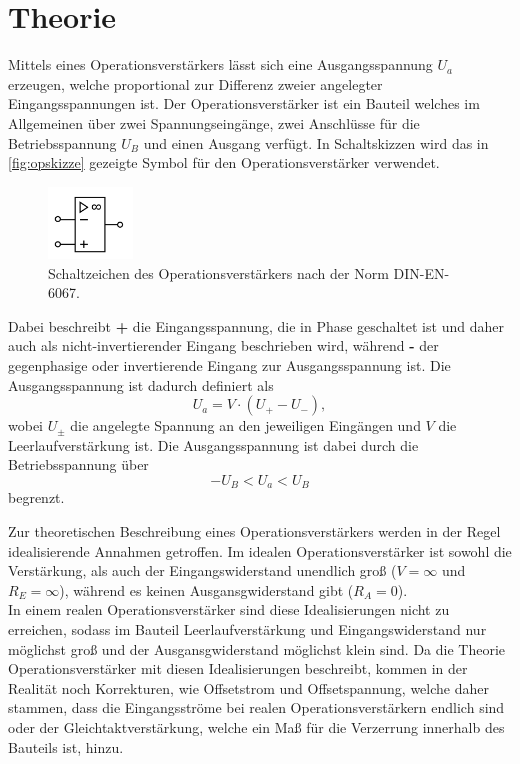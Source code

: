 \section{Theorie}
\label{sec:theorie}
Mittels eines Operationsverstärkers lässt sich eine Ausgangsspannung $U_a$ erzeugen, welche 
proportional zur Differenz zweier angelegter Eingangsspannungen ist. 
Der Operationsverstärker ist ein Bauteil welches im Allgemeinen über zwei Spannungseingänge, zwei Anschlüsse 
für die Betriebsspannung $U_B$ und einen Ausgang 
verfügt. In Schaltskizzen wird 
das in \autoref{fig:opskizze} gezeigte Symbol für den Operationsverstärker verwendet.
\begin{figure}[H]
    \centering
    \includegraphics[width=0.2\textwidth]{op.png}
    \caption{Schaltzeichen des Operationsverstärkers \cite{anleitung} nach der Norm DIN-EN-6067.}
    \label{fig:opskizze}
\end{figure}
Dabei beschreibt 
\textbf{+} die Eingangsspannung, die in Phase geschaltet ist und daher auch als nicht-invertierender
Eingang beschrieben wird, während \textbf{-} der gegenphasige oder invertierende Eingang 
zur Ausgangsspannung ist. Die Ausgangsspannung ist dadurch definiert als 
\begin{equation*}
    U_a = V \cdot  (U_+ - U_-),
\end{equation*}
wobei $U_{\pm}$ die angelegte Spannung an den jeweiligen Eingängen und $V$ die Leerlaufverstärkung ist.
Die Ausgangsspannung ist dabei durch die Betriebsspannung über 
\begin{equation*}
    - U_B < U_a < U_B
\end{equation*}
begrenzt.

Zur theoretischen Beschreibung eines Operationsverstärkers werden in der Regel idealisierende 
Annahmen getroffen. Im idealen Operationsverstärker ist sowohl die Verstärkung, als auch 
der Eingangswiderstand unendlich groß ($V = \infty$ und $R_E = \infty$),
während es keinen Ausgansgwiderstand gibt ($R_A = 0$). \\
In einem realen Operationsverstärker sind diese Idealisierungen nicht zu erreichen, sodass im Bauteil
Leerlaufverstärkung und Eingangswiderstand nur möglichst groß und der Ausgansgwiderstand möglichst 
klein sind. Da die Theorie Operationsverstärker mit diesen Idealisierungen beschreibt, 
kommen in der Realität noch Korrekturen, wie Offsetstrom und Offsetspannung, welche 
daher stammen, dass die Eingangsströme bei realen Operationsverstärkern endlich sind oder 
der Gleichtaktverstärkung, welche ein Maß für die Verzerrung innerhalb des Bauteils ist, hinzu.

